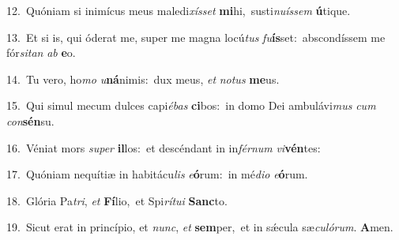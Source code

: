 {\numbfont\textcolor{\numbcolor}{12.}}~Quóniam si inimícus meus maledi\-\textit{xís}\-\textit{set} \textbf{mi}\-hi,~\star susti\-\textit{nu}\-\textit{ís}\textit{sem} \textbf{ú}\-tique.\par
{\numbfont\textcolor{\numbcolor}{13.}}~Et si is, qui óderat me, super me magna locú\textit{tus} \textit{fu}\-\textbf{ís}set:~\star abscondíssem me fór\-\textit{si}\-\textit{tan} \textit{ab} \textbf{e}\-o.\par
{\numbfont\textcolor{\numbcolor}{14.}}~Tu vero, ho\textit{mo} \textit{u}\-\textbf{ná}nimis:~\star dux meus, \textit{et} \textit{no}\-\textit{tus} \textbf{me}\-us.\par
{\numbfont\textcolor{\numbcolor}{15.}}~Qui simul mecum dulces capi\-\textit{é}\-\textit{bas} \textbf{ci}\-bos:~\star in domo Dei ambulávi\textit{mus} \textit{cum} \textit{con}\-\textbf{sén}su.\par
{\numbfont\textcolor{\numbcolor}{16.}}~Véniat mors \textit{su}\-\textit{per} \textbf{il}\-los:~\star et descéndant in in\-\textit{fér}\-\textit{num} \textit{vi}\-\textbf{vén}tes:\par
{\numbfont\textcolor{\numbcolor}{17.}}~Quóniam nequítiæ in habitácu\textit{lis} \textit{e}\-\textbf{ó}rum:~\star in mé\-\textit{di}\-\textit{o} \textit{e}\-\textbf{ó}rum.\par
{\numbfont\textcolor{\numbcolor}{18.}}~Glória Pa\-\textit{tri}\-, \textit{et} \textbf{Fí}\-lio,~\star et Spi\-\textit{rí}\-\textit{tu}\textit{i} \textbf{Sanc}\-to.\par
{\numbfont\textcolor{\numbcolor}{19.}}~Sicut erat in princípio, et \textit{nunc}\-, \textit{et} \textbf{sem}\-per,~\star et in sǽcula sæ\-\textit{cu}\-\textit{ló}\textit{rum}. \textbf{A}\-men.\par
